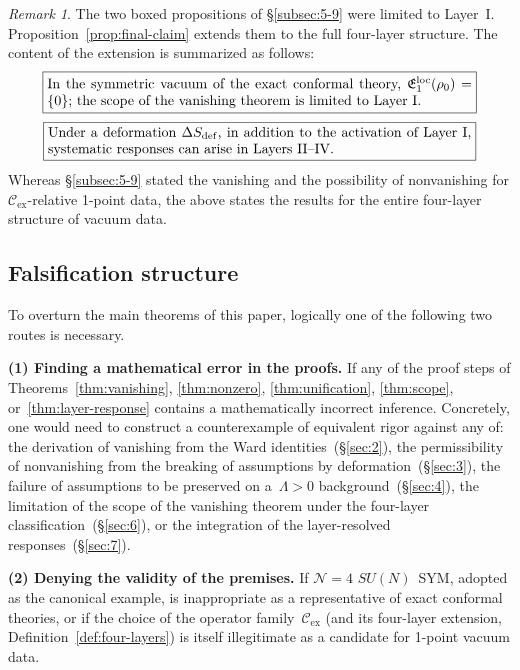 \documentclass[
  aps,
  prd,
  preprint,
  groupedaddress,
  nofootinbib,
  longbibliography
]{revtex4-2}
\theoremstyle{remark}
\newtheorem{remark}[definition]{Remark}
\newcommand{\Cex}{\mathcal{C}_{\mathrm{ex}}}
\newcommand{\N}{\mathcal{N}}
\begin{document}
\begin{remark}\label{rem:extension-from-5}
The two boxed propositions of \S\ref{subsec:5-9} were limited
to Layer~I\@.
Proposition~\ref{prop:final-claim} extends them to the full
four-layer structure.
The content of the extension is summarized as follows:
\begin{equation}\label{eq:final-box1}
  \fbox{\parbox{0.88\columnwidth}{%
    In the symmetric vacuum of the exact conformal theory,
    $\mathfrak{E}_1^{\mathrm{loc}}(\rho_0)=\{0\}$;
    the scope of the vanishing theorem is limited to
    Layer~I.}}
\end{equation}
\begin{equation}\label{eq:final-box2}
  \fbox{\parbox{0.88\columnwidth}{%
    Under a deformation~$\Delta S_{\mathrm{def}}$,
    in addition to the activation of Layer~I,
    systematic responses can arise in Layers~II--IV.}}
\end{equation}
Whereas \S\ref{subsec:5-9} stated the vanishing and the
possibility of nonvanishing for $\Cex$-relative 1-point data,
the above states the results for the entire four-layer structure
of vacuum data.
\end{remark}

\subsection{Falsification structure}\label{subsec:8-3}

To overturn the main theorems of this paper, logically one of the
following two routes is necessary.

\textbf{(1) Finding a mathematical error in the proofs.}
If any of the proof steps of
Theorems~\ref{thm:vanishing}, \ref{thm:nonzero},
\ref{thm:unification}, \ref{thm:scope},
or~\ref{thm:layer-response}
contains a mathematically incorrect inference.
Concretely, one would need to construct a counterexample of
equivalent rigor against any of: the derivation of vanishing
from the Ward identities~(\S\ref{sec:2}), the permissibility
of nonvanishing from the breaking of assumptions by
deformation~(\S\ref{sec:3}), the failure of assumptions to be
preserved on a~$\Lambda>0$ background~(\S\ref{sec:4}), the
limitation of the scope of the vanishing theorem under the
four-layer classification~(\S\ref{sec:6}), or the integration
of the layer-resolved responses~(\S\ref{sec:7}).

\textbf{(2) Denying the validity of the premises.}
If $\N=4$ $SU(N)$~SYM, adopted as the canonical example, is
inappropriate as a representative of exact conformal theories,
or if the choice of the operator family~$\Cex$ (and its
four-layer extension, Definition~\ref{def:four-layers}) is
itself illegitimate as a candidate for 1-point vacuum data.
\end{document}
